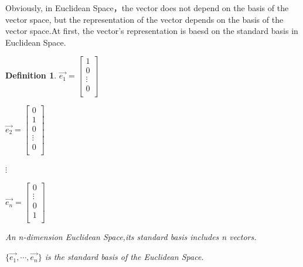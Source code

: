 \documentclass[a4paper,12pt]{report}
\newtheorem{definition}{Definition}[section]     %
\begin{document}
Obviously, in Euclidean Space，the vector does not depend on the basis of the vector space, but the representation of the vector depends on the basis of the vector space.At first, the vector's representation is baesd on the standard basis in Euclidean Space.
\begin{definition}
    $\vec{e_1}=
        \begin{bmatrix}
            1 \\
            0 \\
            \vdots \\
            0 \\
        \end{bmatrix}$

    $\vec{e_2}=
        \begin{bmatrix}
            0 \\
            1 \\
            0 \\
            \vdots \\
            0 \\
        \end{bmatrix}$

    $\vdots$

    $\vec{e_n}=
        \begin{bmatrix}
            0 \\
            \vdots \\
            0 \\
            1 \\
        \end{bmatrix}$

    An n-dimension Euclidean Space,its standard basis includes n vectors.

    $\{\vec{e_1},\cdots,\vec{e_n}\}$ is the standard basis of the Euclidean Space.
\end{definition}
\end{document}
